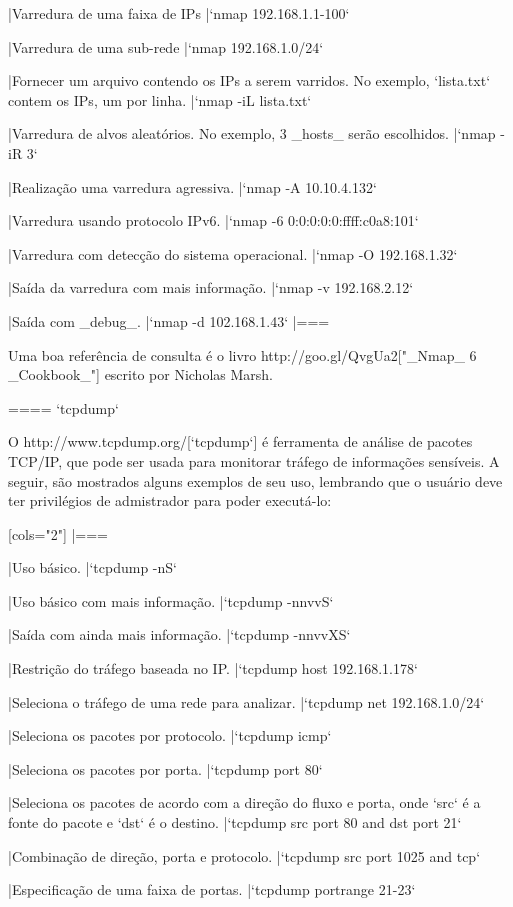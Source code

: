 |Varredura de uma faixa de IPs
|`nmap 192.168.1.1-100`

|Varredura de uma sub-rede
|`nmap 192.168.1.0/24`

|Fornecer um arquivo contendo os IPs a serem varridos. No exemplo, `lista.txt` contem os IPs, um por linha.
|`nmap -iL lista.txt`

|Varredura de alvos aleatórios. No exemplo, 3 _hosts_ serão escolhidos.
|`nmap -iR 3` 

|Realização uma varredura agressiva.
|`nmap -A 10.10.4.132`

|Varredura usando protocolo IPv6.
|`nmap -6 0:0:0:0:0:ffff:c0a8:101`

|Varredura com detecção do sistema operacional.
|`nmap -O 192.168.1.32`

|Saída da varredura com mais informação.
|`nmap -v 192.168.2.12`

|Saída com _debug_.
|`nmap -d 102.168.1.43`
|===

Uma boa referência de consulta é o livro http://goo.gl/QvgUa2["_Nmap_ 6 _Cookbook_"] escrito por Nicholas Marsh.

==== `tcpdump`

O http://www.tcpdump.org/[`tcpdump`] é ferramenta de análise de
pacotes TCP/IP, que pode ser usada para monitorar tráfego de
informações sensíveis. A seguir, são mostrados alguns exemplos de seu
uso, lembrando que o usuário deve ter privilégios de admistrador para
poder executá-lo:

[cols="2"]
|===

|Uso básico.
|`tcpdump -nS`

|Uso básico com mais informação.
|`tcpdump -nnvvS`

|Saída com ainda mais informação.
|`tcpdump -nnvvXS`

|Restrição do tráfego baseada no IP.
|`tcpdump host 192.168.1.178`

|Seleciona o tráfego de uma rede para analizar.
|`tcpdump net 192.168.1.0/24`

|Seleciona os pacotes por protocolo.
|`tcpdump icmp`

|Seleciona os pacotes por porta.
|`tcpdump port 80`

|Seleciona os pacotes de acordo com a direção do fluxo e porta, onde `src` é a fonte do pacote e `dst` é o destino.
|`tcpdump src port 80 and dst port 21`

|Combinação de direção, porta e protocolo.
|`tcpdump src port 1025 and tcp`

|Especificação de uma faixa de portas.
|`tcpdump portrange 21-23`

